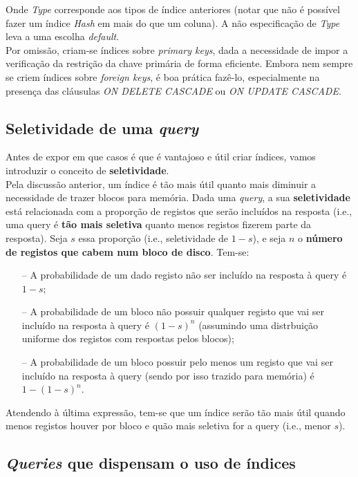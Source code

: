 \documentclass[oneside]{book}
\theoremstyle{definition}
\begin{document}
Onde \textit{Type} corresponde aos tipos de índice anteriores (notar que não é possível fazer um índice \textit{Hash} em mais do que um coluna). A não especificação de \textit{Type} leva a uma escolha \textit{default}. \\
Por omissão, criam-se índices sobre \textit{primary keys}, dada a necessidade de impor a verificação da restrição da chave primária de forma eficiente. Embora nem sempre se criem índices sobre \textit{foreign keys}, é boa prática fazê-lo, especialmente na presença das cláusulas \textit{ON DELETE CASCADE} ou \textit{ON UPDATE CASCADE}.

\subsection{Seletividade de uma \textit{query}}

Antes de expor em que casos é que é vantajoso e útil criar índices, vamos introduzir o conceito de \textbf{seletividade}.\\
Pela discussão anterior, um índice é tão mais útil quanto mais diminuir a necessidade de trazer blocos para memória. Dada uma \textit{query}, a sua \textbf{seletividade} está relacionada com a proporção de registos que serão incluídos na resposta (i.e., uma query é \textbf{tão mais seletiva} quanto menos registos fizerem parte da resposta). Seja $s$ essa proporção (i.e., seletividade de $1 - s$), e seja $n$ o \textbf{número de registos que cabem num bloco de disco}. Tem-se:

\begin{itemize}
    \itemsep0cm
    \item[--] A probabilidade de um dado registo não ser incluído na resposta à query é $1 - s$;
    \item[--] A probabilidade de um bloco não possuir qualquer registo que vai ser incluído na resposta à query é $(1-s)^n$ (assumindo uma distrbuição uniforme dos registos com respostas pelos blocos);
    \item[--] A probabilidade de um bloco possuir pelo menos um registo que vai ser incluído na resposta à query (sendo por isso trazido para memória) é $1 - (1-s)^n$.
\end{itemize}
Atendendo à última expressão, tem-se que um índice serão tão mais útil quando menos registos houver por bloco e quão mais seletiva for a query (i.e., menor $s$).

\subsection{\textit{Queries} que dispensam o uso de índices}
\end{document}
